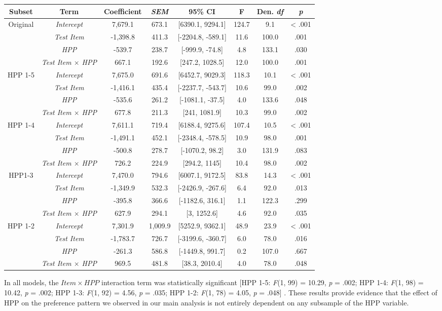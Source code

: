 \documentclass[english,man,man,floatsintext]{apa6}
\begin{document}
\begin{appendix}
\begin{longtable}[]{@{}cccccccc@{}}
\toprule
\textbf{Subset} & \textbf{Term} & \textbf{Coefficient} &
\textbf{\emph{SEM}} & \textbf{95\% CI} & \textbf{F} & \textbf{Den.
\emph{df}} & \textbf{\emph{p}}\tabularnewline
\midrule
\endhead
Original & \emph{Intercept} & 7,679.1 & 673.1 & {[}6390.1, 9294.1{]} &
124.7 & 9.1 & \textless{} .001\tabularnewline
& \emph{Test Item} & -1,398.8 & 411.3 & {[}-2204.8, -589.1{]} & 11.6 &
100.0 & .001\tabularnewline
& \emph{HPP} & -539.7 & 238.7 & {[}-999.9, -74.8{]} & 4.8 & 133.1 &
.030\tabularnewline
& \emph{Test Item \(\times\) HPP} & 667.1 & 192.6 & {[}247.2, 1028.5{]}
& 12.0 & 100.0 & .001\tabularnewline
HPP 1-5 & \emph{Intercept} & 7,675.0 & 691.6 & {[}6452.7, 9029.3{]} &
118.3 & 10.1 & \textless{} .001\tabularnewline
& \emph{Test Item} & -1,416.1 & 435.4 & {[}-2237.7, -543.7{]} & 10.6 &
99.0 & .002\tabularnewline
& \emph{HPP} & -535.6 & 261.2 & {[}-1081.1, -37.5{]} & 4.0 & 133.6 &
.048\tabularnewline
& \emph{Test Item \(\times\) HPP} & 677.8 & 211.3 & {[}241, 1081.9{]} &
10.3 & 99.0 & .002\tabularnewline
HPP 1-4 & \emph{Intercept} & 7,611.1 & 719.4 & {[}6188.4, 9275.6{]} &
107.4 & 10.5 & \textless{} .001\tabularnewline
& \emph{Test Item} & -1,491.1 & 452.1 & {[}-2348.4, -578.5{]} & 10.9 &
98.0 & .001\tabularnewline
& \emph{HPP} & -500.8 & 278.7 & {[}-1070.2, 98.2{]} & 3.0 & 131.9 &
.083\tabularnewline
& \emph{Test Item \(\times\) HPP} & 726.2 & 224.9 & {[}294.2, 1145{]} &
10.4 & 98.0 & .002\tabularnewline
HPP1-3 & \emph{Intercept} & 7,470.0 & 794.6 & {[}6007.1, 9172.5{]} &
83.8 & 14.3 & \textless{} .001\tabularnewline
& \emph{Test Item} & -1,349.9 & 532.3 & {[}-2426.9, -267.6{]} & 6.4 &
92.0 & .013\tabularnewline
& \emph{HPP} & -395.8 & 366.6 & {[}-1182.6, 316.1{]} & 1.1 & 122.3 &
.299\tabularnewline
& \emph{Test Item \(\times\) HPP} & 627.9 & 294.1 & {[}3, 1252.6{]} &
4.6 & 92.0 & .035\tabularnewline
HPP 1-2 & \emph{Intercept} & 7,301.9 & 1,009.9 & {[}5252.9, 9362.1{]} &
48.9 & 23.9 & \textless{} .001\tabularnewline
& \emph{Test Item} & -1,783.7 & 726.7 & {[}-3199.6, -360.7{]} & 6.0 &
78.0 & .016\tabularnewline
& \emph{HPP} & -261.3 & 586.8 & {[}-1449.8, 991.7{]} & 0.2 & 107.0 &
.667\tabularnewline
& \emph{Test Item \(\times\) HPP} & 969.5 & 481.8 & {[}38.3, 2010.4{]} &
4.0 & 78.0 & .048\tabularnewline
\bottomrule
\end{longtable}

In all models, the \(Item \times HPP\) interaction term was
statistically significant {[}HPP 1-5: \emph{F}(1, 99) = 10.29, \emph{p}
= .002; HPP 1-4: \emph{F}(1, 98) = 10.42, \emph{p} = .002; HPP 1-3:
\emph{F}(1, 92) = 4.56, \emph{p} = .035; HPP 1-2: \emph{F}(1, 78) =
4.05, \emph{p} = .048{]} . These results provide evidence that the
effect of HPP on the preference pattern we observed in our main analysis
is not entirely dependent on any subsample of the HPP variable.


\end{appendix}
\end{document}
